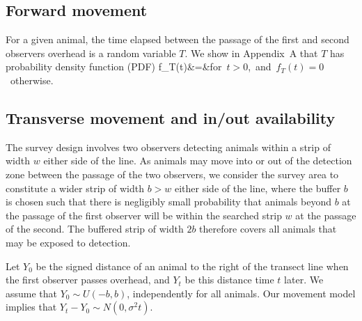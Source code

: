 \documentclass[useAMS, usenatbib, referee]{biom}\usepackage[]{graphicx}\usepackage[]{color}
\begin{document}
\subsection{Forward movement}

For a given animal, the time elapsed between the passage of the first and second observers overhead is a random variable $T$. We show in Appendix~A that $T$ has probability density function (PDF)
\be
f_{T}(t)&=&\;\;\mbox{for $t>0$, and $f_{T}(t)=0$ otherwise.}
\label{eq:fTt}
\ee
\noindent





\subsection{Transverse movement and in/out availability}


The survey design involves two observers detecting animals within a strip of width $w$ either side of the line. As animals may move into or out of the detection zone between the passage of the two observers, we consider the survey area to constitute a wider strip of width $b>w$ either side of the line, where the buffer $b$ is chosen such that there is negligibly small probability that animals beyond $b$ at the passage of the first observer will be within the searched strip $w$ at the passage of the second. The buffered strip of width $2b$ therefore covers all animals that may be exposed to detection.

Let $Y_0$ be the signed distance of an animal to the right of the transect line when the first observer passes overhead, and $Y_t$ be this distance time $t$ later. We assume that $Y_0\sim U(-b,b)$, independently for all animals. Our movement model implies that $Y_t-Y_0\sim N(0,\sigma^2t)$.
\end{document}
